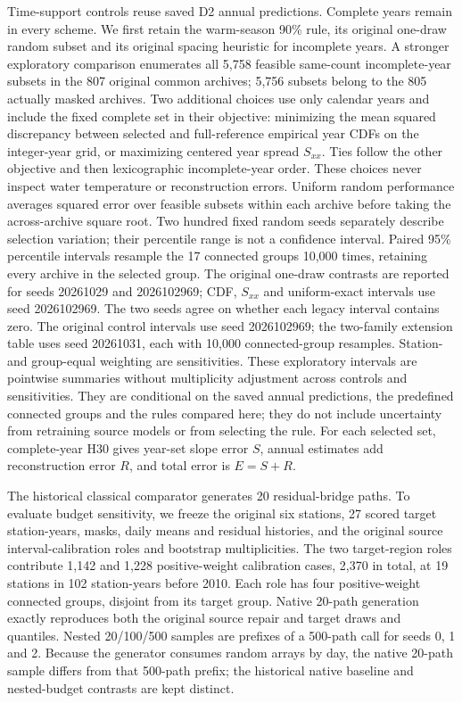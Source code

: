 \documentclass[draft,linenumbers]{agujournal2025}
\begin{document}
Time-support controls reuse saved D2 annual predictions. Complete years remain in every scheme. We first retain the warm-season 90\% rule, its original one-draw random subset and its original spacing heuristic for incomplete years. A stronger exploratory comparison enumerates all 5,758 feasible same-count incomplete-year subsets in the 807 original common archives; 5,756 subsets belong to the 805 actually masked archives. Two additional choices use only calendar years and include the fixed complete set in their objective: minimizing the mean squared discrepancy between selected and full-reference empirical year CDFs on the integer-year grid, or maximizing centered year spread $S_{xx}$. Ties follow the other objective and then lexicographic incomplete-year order. These choices never inspect water temperature or reconstruction errors. Uniform random performance averages squared error over feasible subsets within each archive before taking the across-archive square root. Two hundred fixed random seeds separately describe selection variation; their percentile range is not a confidence interval. Paired 95\% percentile intervals resample the 17 connected groups 10,000 times, retaining every archive in the selected group. The original one-draw contrasts are reported for seeds 20261029 and 2026102969; CDF, $S_{xx}$ and uniform-exact intervals use seed 2026102969. The two seeds agree on whether each legacy interval contains zero. The original control intervals use seed 2026102969; the two-family extension table uses seed 20261031, each with 10,000 connected-group resamples. Station- and group-equal weighting are sensitivities. These exploratory intervals are pointwise summaries without multiplicity adjustment across controls and sensitivities. They are conditional on the saved annual predictions, the predefined connected groups and the rules compared here; they do not include uncertainty from retraining source models or from selecting the rule. For each selected set, complete-year H30 gives year-set slope error $S$, annual estimates add reconstruction error $R$, and total error is $E=S+R$.

The historical classical comparator generates 20 residual-bridge paths. To evaluate budget sensitivity, we freeze the original six stations, 27 scored target station-years, masks, daily means and residual histories, and the original source interval-calibration roles and bootstrap multiplicities. The two target-region roles contribute 1,142 and 1,228 positive-weight calibration cases, 2,370 in total, at 19 stations in 102 station-years before 2010. Each role has four positive-weight connected groups, disjoint from its target group. Native 20-path generation exactly reproduces both the original source repair and target draws and quantiles. Nested 20/100/500 samples are prefixes of a 500-path call for seeds 0, 1 and 2. Because the generator consumes random arrays by day, the native 20-path sample differs from that 500-path prefix; the historical native baseline and nested-budget contrasts are kept distinct.
\end{document}
